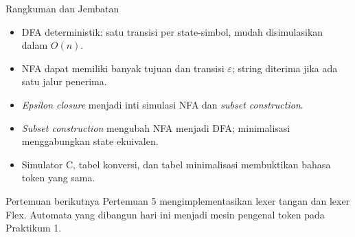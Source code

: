 \documentclass[aspectratio=169,10pt,t]{beamer}
\begin{document}
\begin{frame}{Rangkuman dan Jembatan}
  \begin{itemize}
    \item DFA deterministik: satu transisi per state-simbol, mudah
          disimulasikan dalam \(O(n)\).
    \item NFA dapat memiliki banyak tujuan dan transisi
          \(\varepsilon\); string diterima jika ada satu jalur
          penerima.
    \item \textit{Epsilon closure} menjadi inti simulasi NFA dan
          \textit{subset construction}.
    \item \textit{Subset construction} mengubah NFA menjadi DFA;
          minimalisasi menggabungkan state ekuivalen.
    \item Simulator C, tabel konversi, dan tabel minimalisasi membuktikan
          bahasa token yang sama.
  \end{itemize}

  \vspace{4pt}
  \begin{exampleblock}{Pertemuan berikutnya}
    Pertemuan 5 mengimplementasikan lexer tangan dan lexer Flex.
    Automata yang dibangun hari ini menjadi mesin pengenal token pada
    Praktikum 1.
  \end{exampleblock}
\end{frame}
\end{document}
